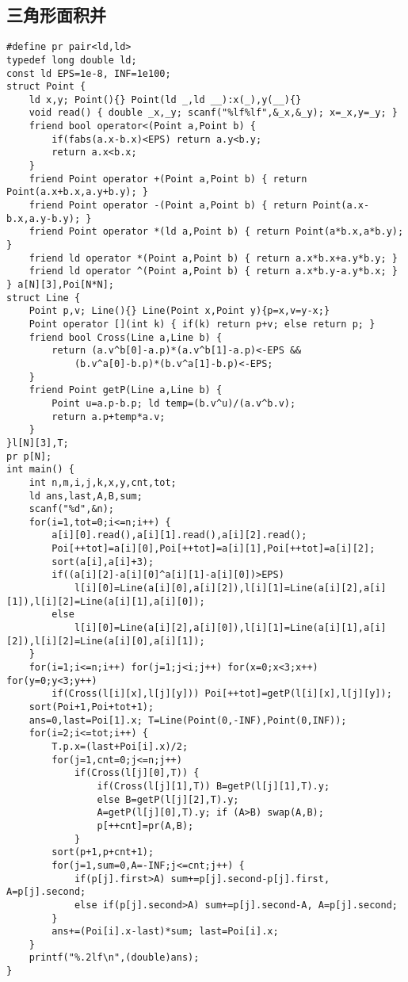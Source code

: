 \documentclass[landscape,a4paper]{article}
\begin{document}
\subsection{三角形面积并}
\begin{lstlisting}
#define pr pair<ld,ld>
typedef long double ld;
const ld EPS=1e-8, INF=1e100;
struct Point {
	ld x,y; Point(){} Point(ld _,ld __):x(_),y(__){}
	void read() { double _x,_y; scanf("%lf%lf",&_x,&_y); x=_x,y=_y; }
	friend bool operator<(Point a,Point b) {
		if(fabs(a.x-b.x)<EPS) return a.y<b.y;
        return a.x<b.x;
    }
	friend Point operator +(Point a,Point b) { return Point(a.x+b.x,a.y+b.y); }
	friend Point operator -(Point a,Point b) { return Point(a.x-b.x,a.y-b.y); }
	friend Point operator *(ld a,Point b) { return Point(a*b.x,a*b.y); }
	friend ld operator *(Point a,Point b) { return a.x*b.x+a.y*b.y; }
	friend ld operator ^(Point a,Point b) { return a.x*b.y-a.y*b.x; }
} a[N][3],Poi[N*N];
struct Line {
    Point p,v; Line(){} Line(Point x,Point y){p=x,v=y-x;}
	Point operator [](int k) { if(k) return p+v; else return p; }
	friend bool Cross(Line a,Line b) {
		return (a.v^b[0]-a.p)*(a.v^b[1]-a.p)<-EPS &&
			(b.v^a[0]-b.p)*(b.v^a[1]-b.p)<-EPS;
	}
	friend Point getP(Line a,Line b) {
		Point u=a.p-b.p; ld temp=(b.v^u)/(a.v^b.v);
		return a.p+temp*a.v;
	}
}l[N][3],T;
pr p[N];
int main() {
	int n,m,i,j,k,x,y,cnt,tot;
	ld ans,last,A,B,sum;
	scanf("%d",&n);
	for(i=1,tot=0;i<=n;i++) {
		a[i][0].read(),a[i][1].read(),a[i][2].read();
		Poi[++tot]=a[i][0],Poi[++tot]=a[i][1],Poi[++tot]=a[i][2];
		sort(a[i],a[i]+3);
		if((a[i][2]-a[i][0]^a[i][1]-a[i][0])>EPS)
			l[i][0]=Line(a[i][0],a[i][2]),l[i][1]=Line(a[i][2],a[i][1]),l[i][2]=Line(a[i][1],a[i][0]);
		else
			l[i][0]=Line(a[i][2],a[i][0]),l[i][1]=Line(a[i][1],a[i][2]),l[i][2]=Line(a[i][0],a[i][1]);
    }
	for(i=1;i<=n;i++) for(j=1;j<i;j++) for(x=0;x<3;x++) for(y=0;y<3;y++)
		if(Cross(l[i][x],l[j][y])) Poi[++tot]=getP(l[i][x],l[j][y]);
	sort(Poi+1,Poi+tot+1);
	ans=0,last=Poi[1].x; T=Line(Point(0,-INF),Point(0,INF));
	for(i=2;i<=tot;i++) {
        T.p.x=(last+Poi[i].x)/2;
        for(j=1,cnt=0;j<=n;j++)
            if(Cross(l[j][0],T)) {
                if(Cross(l[j][1],T)) B=getP(l[j][1],T).y;
                else B=getP(l[j][2],T).y;
                A=getP(l[j][0],T).y; if (A>B) swap(A,B);
                p[++cnt]=pr(A,B);
            }
        sort(p+1,p+cnt+1);
        for(j=1,sum=0,A=-INF;j<=cnt;j++) {
            if(p[j].first>A) sum+=p[j].second-p[j].first, A=p[j].second;
            else if(p[j].second>A) sum+=p[j].second-A, A=p[j].second;
        }
		ans+=(Poi[i].x-last)*sum; last=Poi[i].x;
	}
	printf("%.2lf\n",(double)ans);
}
\end{lstlisting}
\end{document}
